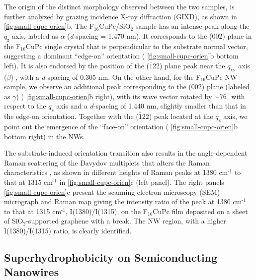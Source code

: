 The origin of the distinct morphology observed between the two
samples, is further analyzed by grazing incidence X-ray diffraction
(GIXD), as shown in \autoref{fig:small-cupc-orien}b.
The F\(_{\text{16}}\)CuPc/SiO\(_{\text{2}}\) sample has an intense
peak along the \(q_{\mathrm{z}}\) axis, labeled as \(\alpha\)
(\emph{d}-spacing = 1.470 nm). It corresponds to the (002) plane in
the F\(_{\text{16}}\)CuPc single crystal \cite{Yang_2009_F16_PTCDA}
that is perpendicular to the substrate normal vector, suggesting a
dominant ``edge-on'' orientation ( \autoref{fig:small-cupc-orien}b
bottom left). It is also endorsed by the position of the
(\(\bar{1}\)22) plane peak near the \(q_{\mathrm{xy}}\) axis
(\(\beta\)) \cite{Yoon_2010_crystal_F16cuPc}, with a \emph{d}-spacing
of 0.305 nm. On the other hand, for the F\(_{\text{16}}\)CuPc NW
sample, we observe an additional peak corresponding to the (002) plane
(labeled as \(\gamma\)) ( \autoref{fig:small-cupc-orien}b right), with
its wave vector rotated by \(\sim 76^{\circ}\) with respect to the
\(q_{\mathrm{z}}\) axis and a \emph{d}-spacing of 1.440 nm, slightly
smaller than that in the edge-on orientation. Together with the
(\(\bar{1}\)22) peak located at the \(q_{\mathrm{z}}\) axis, we point
out the emergence of the ``face-on'' orientation (
\autoref{fig:small-cupc-orien}b bottom right) in the NWs.


The substrate-induced orientation transition also results in the
angle-dependent Raman scattering of the Davydov multiplets that alters
the Raman characteristics \cite{Cerdeira_2013_RamanF16}, as shown in
different heights of Raman peaks at 1380 cm\(^{\text{-1}}\) to that at
1315 cm\(^{\text{-1}}\) in \autoref{fig:small-cupc-orien}c (left
panel).  The right panels \autoref{fig:small-cupc-orien}c present the scanning
electron microscopy (SEM) micrograph and Raman map giving the
intensity ratio of the peak at 1380 cm\(^{\text{-1}}\) to that at 1315
cm\(^{\text{-1}}\), I(1380)/I(1315), on the F\(_{\text{16}}\)CuPc film
deposited on a sheet of SiO\(_{\text{2}}\)-supported graphene with a
break. The NW region, with a higher I(1380)/I(1315) ratio, is clearly
identified.


\subsection{Superhydrophobicity on Semiconducting Nanowires}
\label{sec:small-superhydr-nw}


